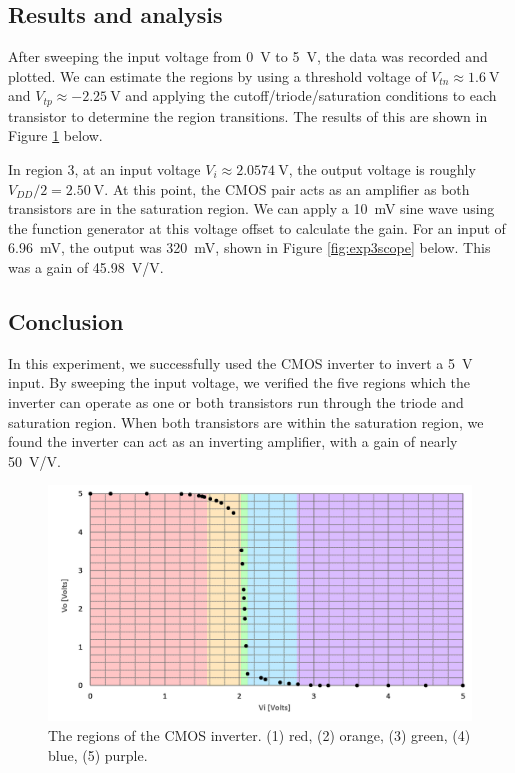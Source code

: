 \documentclass{report}
\begin{document}
\subsection{Results and analysis}

After sweeping the input voltage from \SI{0}{\V} to \SI{5}{\V}, the data was recorded and plotted. We can estimate the regions by using a threshold voltage of $V_{tn} \approx \SI{1.6}{\V}$ and $V_{tp} \approx \SI{-2.25}{\V}$ and applying the cutoff/triode/saturation conditions to each transistor to determine the region transitions. The results of this are shown in Figure \ref{fig:exp3coloredregions} below.


In region 3, at an input voltage $V_i \approx \SI{2.0574}{\V}$, the output voltage is roughly $V_{DD}/2=\SI{2.50}{\V}$. At this point, the CMOS pair acts as an amplifier as both transistors are in the saturation region. We can apply a \SI{10}{\mV} sine wave using the function generator at this voltage offset to calculate the gain. For an input of \SI{6.96}{\mV}, the output was \SI{320}{\mV}, shown in Figure \ref{fig:exp3scope} below. This was a gain of \SI{45.98}{\V/\V}.

\subsection{Conclusion}
In this experiment, we successfully used the CMOS inverter to invert a \SI{5}{\V} input. By sweeping the input voltage, we verified the five regions which the inverter can operate as one or both transistors run through the triode and saturation region. When both transistors are within the saturation region, we found the inverter can act as an inverting amplifier, with a gain of nearly \SI{50}{\V/\V}.

\begin{figure}[H]
	\centering
	\includegraphics[width=0.9\linewidth]{exp3coloredregions}
	\caption{The regions of the CMOS inverter. (1) red, (2) orange, (3) green, (4) blue, (5) purple.}
	\label{fig:exp3coloredregions}
\end{figure}
\end{document}
